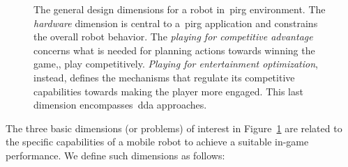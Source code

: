 \begin{figure}[h]
    \caption{The general design dimensions for a robot in~\gls{pirg} environment. The \textit{hardware} dimension is central to a~\gls{pirg} application and constrains the overall robot behavior. The \textit{playing for competitive advantage} concerns what is needed for planning actions towards winning the game,\ie, play competitively. \textit{Playing for entertainment optimization}, instead, defines the mechanisms that regulate its competitive capabilities towards making the player more engaged. This last dimension encompasses~\glsdesc{dda} approaches.}
    \label{graph:PIRG_design_structure}
\end{figure}

The three basic dimensions (or problems) of interest in Figure~\ref{graph:PIRG_design_structure} are related to the specific capabilities of a mobile robot to achieve a suitable in-game performance. We define such dimensions as follows:

